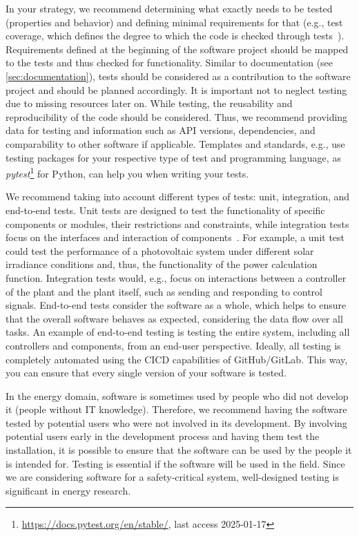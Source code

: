 In your strategy, we recommend determining what exactly needs to be tested (properties and behavior) and defining minimal requirements for that (e.g., test coverage, which defines the degree to which the code is checked through tests~\cite{drlsoftwareinitiative}). Requirements defined at the beginning of the software project should be mapped to the tests and thus checked for functionality. Similar to documentation (see \ref{sec:documentation}), tests should be considered as a contribution to the software project and should be planned accordingly. It is important not to neglect testing due to missing resources later on.
While testing, the reusability and reproducibility of the code should be considered. Thus, we recommend providing data for testing and information such as API versions, dependencies, and comparability to other software if applicable. 
Templates and standards, e.g., use testing packages for your respective type of test and programming language, as \textit{pytest}\footnote{\url{https://docs.pytest.org/en/stable/}, last access 2025-01-17} for Python, can help you when writing your tests.

We recommend taking into account different types of tests: unit, integration, and end-to-end tests. Unit tests are designed to test the functionality of specific components or modules, their restrictions and constraints, while integration tests focus on the interfaces and interaction of components~\cite{drlsoftwareinitiative}. For example, a unit test could test the performance of a photovoltaic system under different solar irradiance conditions and, thus, the functionality of the power calculation function. Integration tests would, e.g., focus on interactions between a controller of the plant and the plant itself, such as sending and responding to control signals. End-to-end tests consider the software as a whole, which helps to ensure that the overall software behaves as expected, considering the data flow over all tasks. An example of end-to-end testing is testing the entire system, including all controllers and components, from an end-user perspective. Ideally, all testing is completely automated using the \ac{CICD} capabilities of GitHub/GitLab. This way, you can ensure that every single version of your software is tested. \par

In the energy domain, software is sometimes used by people who did not develop it (people without IT knowledge). Therefore, we recommend having the software tested by potential users who were not involved in its development. By involving potential users early in the development process and having them test the installation, it is possible to ensure that the software can be used by the people it is intended for. Testing is essential if the software will be used in the field. Since we are considering software for a safety-critical system, well-designed testing is significant in energy research.
